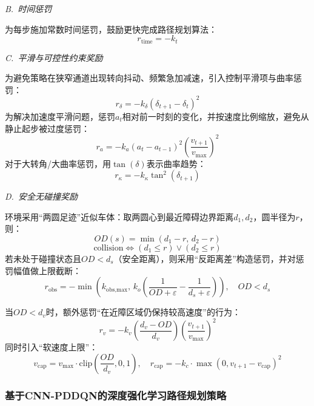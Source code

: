 \documentclass{iopjournal}
\begin{document}
\textit{B.~时间惩罚}

为每步施加常数时间惩罚，鼓励更快完成路径规划算法：
\begin{equation}
  r_{\text{time}} = -k_t
\end{equation}

\textit{C.~平滑与可控性约束奖励}

为避免策略在狭窄通道出现转向抖动、频繁急加减速，引入控制平滑项与曲率惩罚：
\begin{equation}
  r_\delta = -k_\delta(\delta_{t+1}-\delta_t)^2
\end{equation}
为解决加速度平滑问题，惩罚$a_t$相对前一时刻的变化，并按速度比例缩放，避免从静止起步被过度惩罚：
\begin{equation}
  r_a = -k_a(a_t - a_{t-1})^2\left(\frac{v_{t+1}}{v_{\max}}\right)^2
\end{equation}
对于大转角/大曲率惩罚，用$\tan(\delta)$表示曲率趋势：
\begin{equation}
  r_\kappa = -k_\kappa \tan^2(\delta_{t+1})
\end{equation}

\textit{D.~安全无碰撞奖励}

环境采用``两圆足迹''近似车体：取两圆心到最近障碍边界距离$d_1, d_2$，圆半径为$r$，则：
\begin{equation}
  OD(s) = \min(d_1 - r,\, d_2 - r)
\end{equation}
\begin{equation}
  \text{collision} \Leftrightarrow (d_1 \leq r) \vee (d_2 \leq r)
\end{equation}
若未处于碰撞状态且$OD < d_s$（安全距离），则采用``反距离差''构造惩罚，并对惩罚幅值做上限截断：
\begin{equation}
  r_{\text{obs}} = -\min\!\left(k_{\text{obs,max}},\, k_o\!\left(\frac{1}{OD+\varepsilon}-\frac{1}{d_s+\varepsilon}\right)\right),\quad OD < d_s
\end{equation}

当$OD < d_v$时，额外惩罚``在近障区域仍保持较高速度''的行为：
\begin{equation}
  r_v = -k_v\left(\frac{d_v - OD}{d_v}\right)\left(\frac{v_{t+1}}{v_{\max}}\right)^2
\end{equation}
同时引入``软速度上限''：
\begin{equation}
  v_{\text{cap}} = v_{\max} \cdot \text{clip}\!\left(\frac{OD}{d_v}, 0, 1\right),\quad
  r_{\text{cap}} = -k_c \cdot \max(0, v_{t+1} - v_{\text{cap}})^2
\end{equation}

\subsubsection{基于CNN-PDDQN的深度强化学习路径规划策略}
\end{document}
